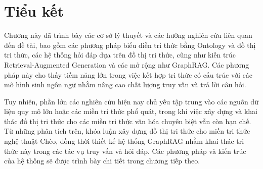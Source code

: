 
\section*{Tiểu kết}
Chương này đã trình bày các cơ sở lý thuyết và các hướng nghiên cứu liên quan đến đề tài, bao gồm các phương pháp biểu diễn tri thức bằng Ontology và đồ thị tri thức, các hệ thống hỏi đáp dựa trên đồ thị tri thức, cũng như kiến trúc Retrieval-Augmented Generation và các mở rộng như GraphRAG. Các phương pháp này cho thấy tiềm năng lớn trong việc kết hợp tri thức có cấu trúc với các mô hình sinh ngôn ngữ nhằm nâng cao chất lượng truy vấn và trả lời câu hỏi.

Tuy nhiên, phần lớn các nghiên cứu hiện nay chủ yếu tập trung vào các nguồn dữ liệu quy mô lớn hoặc các miền tri thức phổ quát, trong khi việc xây dựng và khai thác đồ thị tri thức cho các miền tri thức văn hóa chuyên biệt vẫn còn hạn chế. Từ những phân tích trên, khóa luận xây dựng đồ thị tri thức cho miền tri thức nghệ thuật Chèo, đồng thời thiết kế hệ thống GraphRAG nhằm khai thác tri thức này trong các tác vụ truy vấn và hỏi đáp. Các phương pháp và kiến trúc của hệ thống sẽ được trình bày chi tiết trong chương tiếp theo.